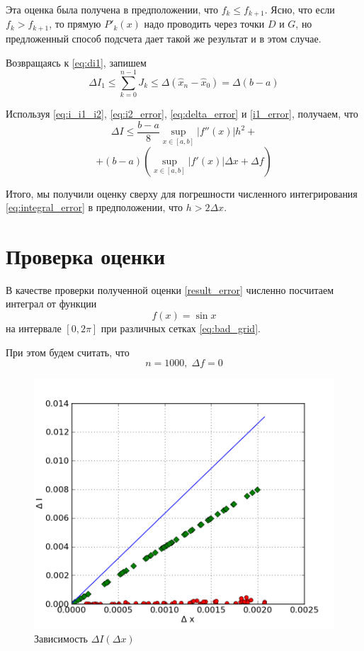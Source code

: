 \documentclass[10pt, twocolumn]{article}
\begin{document}
Эта оценка была получена в предположении, что $f_k \leq f_{k + 1}$. Ясно, что если $f_k > f_{k + 1}$, то прямую $P'_k(x)$ надо проводить через точки $D$ и $G$, но предложенный способ подсчета дает такой же результат и в этом случае.

Возвращаясь к \eqref{eq:di1}, запишем
\begin{equation} \label{i1_error}
  \Delta I_1 \leq \sum \limits_{k = 0}^{n - 1} J_k \leq \Delta (\hat{x}_n - \hat{x}_0) = \Delta (b - a)
\end{equation}

Используя \eqref{eq:i_i1_i2}, \eqref{eq:i2_error}, \eqref{eq:delta_error} и \eqref{i1_error}, получаем, что
\begin{equation*}
  \Delta I \leq \frac{b - a}{8} \sup \limits_{x \in [a, b]} \left| f''(x) \right| h^2 +
\end{equation*}
\begin{equation} \label{result_error}
   + (b - a) (\sup \limits_{x \in [a, b]} \left| f'(x) \right| \Delta x + \Delta f)
\end{equation}

Итого, мы получили оценку сверху для погрешности численного интегрирования \eqref{eq:integral_error} в предположении, что $h > 2 \Delta x$.

\section{Проверка оценки}

В качестве проверки полученной оценки \eqref{result_error} численно посчитаем интеграл от функции
\begin{equation*}
  f(x) = \sin x
\end{equation*}
на интервале $[0, 2 \pi]$ при различных сетках \eqref{eq:bad_grid}.

При этом будем считать, что
\begin{equation*}
  n = 1000, \; \Delta f = 0
\end{equation*}

\begin{figure}
  \centering
  \includegraphics[scale=0.5]{plot.png}
  \caption{Зависимость $\Delta I(\Delta x)$}
\end{figure}
\end{document}
